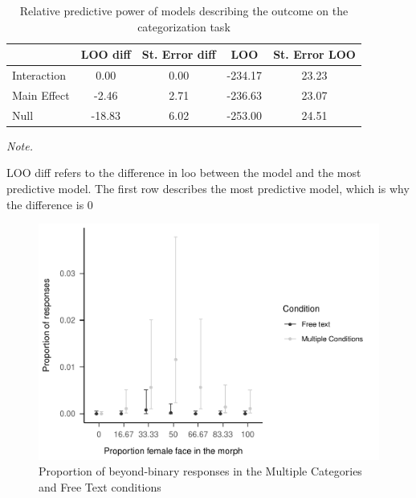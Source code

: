 \documentclass[
  man]{apa7}
\begin{document}
\begin{table}

\caption{\label{tab:loo}Relative predictive power of models describing the outcome on the categorization task}
\centering
\begin{threeparttable}
\begin{tabular}[t]{lcccc}
\toprule
  & LOO diff & St. Error diff & LOO & St. Error LOO\\
\midrule
Interaction & 0.00 & 0.00 & -234.17 & 23.23\\
Main Effect & -2.46 & 2.71 & -236.63 & 23.07\\
Null & -18.83 & 6.02 & -253.00 & 24.51\\
\bottomrule
\end{tabular}
\begin{tablenotes}[para]
\item \textit{Note.} 
\item LOO diff refers to the difference in loo between the model and the most predictive model. The first row describes the most predictive model, which is why the difference is 0
\end{tablenotes}
\end{threeparttable}
\end{table}

\begin{figure}
\centering
\includegraphics{resp_opts_manus23022_files/figure-latex/exp-one-inf-1.pdf}
\caption{\label{fig:exp-one-inf}Proportion of beyond-binary responses in the Multiple Categories and Free Text conditions}
\end{figure}
\end{document}
